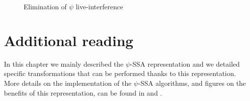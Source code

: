 \begin{figure}
\begin{center}
\footnotesize
\hfill
{}
\hfill
{}
\hfill
{}
\caption{Elimination of $\psi$ live-interference}
\label{fig:live_interference}
\end{center}
\end{figure}


\section{Additional reading}

In this chapter we mainly described the $\psi$-SSA representation and we detailed specific transformations that can be performed thanks to this representation. More details on the implementation of the $\psi$-SSA algorithms, and figures on the benefits of this representation, can be found in \cite{Stoutchinin:2001:MICRO} and \cite{Ferriere:2007:SCOPES}.

